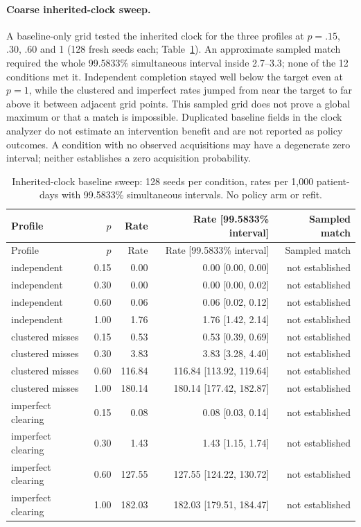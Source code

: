 \documentclass[11pt]{article}
\begin{document}
\paragraph{Coarse inherited-clock sweep.} A baseline-only grid
tested the inherited clock for the three profiles at $p=.15$, .30, .60 and 1
(128 fresh seeds each; Table~\ref{tab:clock-sweep}). An approximate sampled match
required the whole 99.5833\% simultaneous interval inside 2.7--3.3; none of the
12 conditions met it. Independent completion stayed well below the target even
at $p=1$, while the clustered and imperfect rates jumped from near the target to
far above it between adjacent grid points. This sampled grid does not prove a
global maximum or that a match is impossible. Duplicated baseline fields in the
clock analyzer do not estimate an intervention benefit and are not reported as
policy outcomes. A condition with no observed acquisitions may have a degenerate
zero interval; neither establishes a zero acquisition probability.

{\footnotesize
\begin{longtable}{lrrrr}
\caption{Inherited-clock baseline sweep: 128 seeds per condition, rates per 1,000 patient-days with 99.5833\% simultaneous intervals. No policy arm or refit.}\label{tab:clock-sweep}\\
\toprule
Profile & $p$ & Rate & Rate [99.5833\% interval] & Sampled match\\
\midrule\endfirsthead
Profile & $p$ & Rate & Rate [99.5833\% interval] & Sampled match\\
\midrule\endhead
independent & 0.15 & 0.00 & 0.00 [0.00, 0.00] & not established\\
independent & 0.30 & 0.00 & 0.00 [0.00, 0.02] & not established\\
independent & 0.60 & 0.06 & 0.06 [0.02, 0.12] & not established\\
independent & 1.00 & 1.76 & 1.76 [1.42, 2.14] & not established\\
clustered misses & 0.15 & 0.53 & 0.53 [0.39, 0.69] & not established\\
clustered misses & 0.30 & 3.83 & 3.83 [3.28, 4.40] & not established\\
clustered misses & 0.60 & 116.84 & 116.84 [113.92, 119.64] & not established\\
clustered misses & 1.00 & 180.14 & 180.14 [177.42, 182.87] & not established\\
imperfect clearing & 0.15 & 0.08 & 0.08 [0.03, 0.14] & not established\\
imperfect clearing & 0.30 & 1.43 & 1.43 [1.15, 1.74] & not established\\
imperfect clearing & 0.60 & 127.55 & 127.55 [124.22, 130.72] & not established\\
imperfect clearing & 1.00 & 182.03 & 182.03 [179.51, 184.47] & not established\\
\bottomrule
\end{longtable}
}
\end{document}
